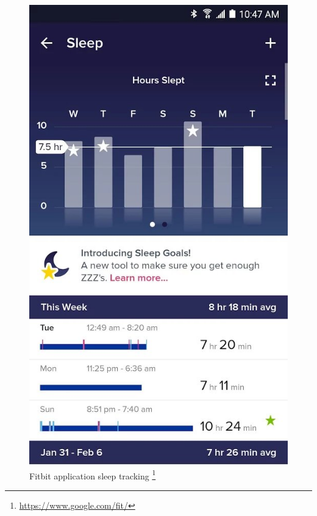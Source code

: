 \begin{figure}[h]
\begin{adjustbox}{width=.4\textwidth,center=\textwidth}
  \centering
  \includegraphics[scale=.5]{images/sleep_tracking.jpg}
\end{adjustbox}
  \caption[Fitbit application sleep tracking]{Fitbit application sleep tracking \footnote{\url{https://www.google.com/fit/}}}
  \label{fig:google_fit}
\end{figure}

